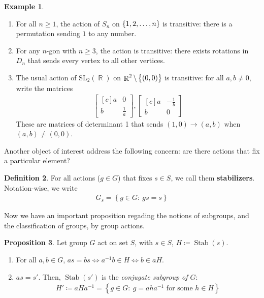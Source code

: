 \documentclass[11pt]{amsart} %
\theoremstyle{definition}
\newtheorem{definition}{Definition}[section]
\newtheorem{proposition}[definition]{Proposition}
\newtheorem{example}[definition]{Example}
\theoremstyle{definition}
\DeclareMathOperator{\R}{\mathbb{R}}
\DeclareMathOperator{\stab}{Stab}
\numberwithin{equation}{section}
\newcommand{\condset}[4]{\left\{ #1  : \: #2 #3 #4 \right\}}
\newcommand{\SL}[2]{\mathrm{SL}_{#1}(#2)}
\begin{document}
\begin{example}
	\begin{enumerate}
		\item For all $n \geq 1$, the action of $S_n$ on $\set{1,2,\dots,n}$ is transitive: there is a permutation sending $1$ to any number.
		\item For any $n$-gon with $n \geq 3$, the action is transitive: there exists rotations in $D_n$ that sends every vertex to all other vertices.
		\item The usual action of $\SL{2}{\R}$ on $\R^2 \setminus \set{(0,0)}$ is transitive: for all $a,b \neq 0$, write the matrices
		\begin{align*}
		\begin{bmatrix*}[c]
		a & 0 \\ b & \frac{1}{a}
		\end{bmatrix*}, \begin{bmatrix*}[c]
		a & -\frac{1}{b} \\ b & 0
		\end{bmatrix*}
		\end{align*}
		These are matrices of determinant 1 that sends $(1,0) \to (a,b)$ when $(a,b) \neq (0,0)$.
	\end{enumerate}
\end{example}

Another object of interest address the following concern: are there actions that fix a particular element?

\begin{definition}
	\label{defstabilizer}
	For all actions ($g \in G$) that fixes $s \in S$, we call them \textbf{stabilizers}. Notation-wise, we write
	\begin{align*}
		G_s = \condset{g \in G}{gs}{=}{s}
	\end{align*}
\end{definition}

Now we have an important proposition regading the notions of subgroups, and the classification of groups, by group actions.

\begin{proposition}
	\label{propstabilizersconjugatesubgroup}
	Let group $G$ act on set $S$, with $s \in S$, $H \coloneqq \stab (s)$.
	\begin{enumerate}
		\item For all $a,b \in G$, $as = bs \iff a^{-1} b \in H \iff b \in aH$.
		\item $as = s'$. Then, $\stab (s')$ is the \textit{conjugate subgroup of $G$}: 
		\begin{align*}
		H' \coloneqq aHa^{-1} = \condset{g \in G}{g = aha^{-1}}{\text{ for some }}{h \in H}
		\end{align*}
	\end{enumerate}
\end{proposition}
\end{document}
